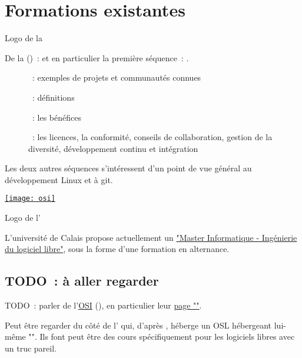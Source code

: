 \chapter{Formations existantes}

\begin{marginfigure}
    \href{https://www.linuxfoundation.org/}{}
    \caption{Logo de la }
\end{marginfigure}

De la  () :
  \href{https://www.edx.org/professional-certificate/linuxfoundationx-open-source-software-development-linux-and-git}
  {}
et en particulier la première séquence :
  \href{https://www.edx.org/course/open-source-software-development-linux-for-developers}
  {}.

\begin{description}
    \item[] : exemples de projets et communautés connues
    \item[] : définitions
    \item[] : les bénéfices
    \item[] : les licences, la conformité, conseils de collaboration, gestion de la
        diversité, développement continu et intégration
\end{description}

Les deux autres séquences s'intéressent d'un point de vue général au développement Linux et à git.

\begin{marginfigure}
    \href{https://opensource.org/}{\texttt{[image: osi]}}
    \caption{Logo de l'}
\end{marginfigure}

L'université de Calais propose actuellement un
\href{https://www.univ-littoral.fr/formation/offre-de-formation/masters/master-informatique-ingenierie-du-logiciel-libre/}{"Master
Informatique - Ingénierie du logiciel libre"}, sous la forme d'une formation en alternance.

\section*{TODO : à aller regarder}

TODO : parler de l'\href{https://opensource.org/}{OSI} (), en particulier leur
\href{https://opensource.org/osi-open-source-education}{page ""}.

Peut être regarder du côté de l' qui, d'après \textcite{barriers-2018}, héberge un
\acrfull{OSL} hébergeant lui-même "". Ils
    font peut être des cours spécifiquement pour les logiciels libres avec un truc pareil.
